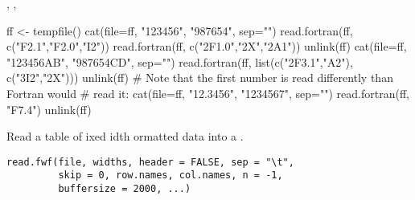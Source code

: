 %
\begin{SeeAlso}\relax
{}, , 
\end{SeeAlso}
%
\begin{Examples}
\begin{ExampleCode}
ff <- tempfile()
cat(file=ff, "123456", "987654", sep="\n")
read.fortran(ff, c("F2.1","F2.0","I2"))
read.fortran(ff, c("2F1.0","2X","2A1"))
unlink(ff)
cat(file=ff, "123456AB", "987654CD", sep="\n")
read.fortran(ff, list(c("2F3.1","A2"), c("3I2","2X")))
unlink(ff)
# Note that the first number is read differently than Fortran would
# read it:
cat(file=ff, "12.3456", "1234567", sep="\n")
read.fortran(ff, "F7.4")
unlink(ff)
\end{ExampleCode}
\end{Examples}
%
\begin{Description}\relax
Read a table of ixed idth ormatted
data into a .
\end{Description}
%
\begin{Usage}
\begin{verbatim}
read.fwf(file, widths, header = FALSE, sep = "\t",
         skip = 0, row.names, col.names, n = -1,
         buffersize = 2000, ...)
\end{verbatim}
\end{Usage}
%

